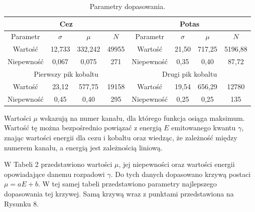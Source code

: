 \documentclass[10pt,a4paper]{article}
\begin{document}
\begin{table}[h!]
\centering
\caption{Parametry dopasowania.}
\begin{tabular}{|c|c|c|c|c|c|c|c|}
\hline
\multicolumn{4}{|c|}{Cez}                  & \multicolumn{4}{c|}{Potas}               \\ \hline
Parametr    & $\sigma$  & $\mu$    & $N$   & Parametr   & $\sigma$ & $\mu$  & $N$     \\ \hline
Wartość     & 12,733    & 332,242  & 49955 & Wartość    & 21,50    & 717,25 & 5196,88 \\ \hline
Niepewność  & 0,067     & 0,075    & 271   & Niepewność & 0,35     & 0,40   & 87,72   \\ \hline
\multicolumn{4}{|c|}{Pierwszy pik kobaltu} & \multicolumn{4}{c|}{Drugi pik kobaltu}   \\ \hline
Wartość     & 23,12     & 577,75   & 19158 & Wartość    & 19,54    & 656,29 & 12780   \\ \hline
Niepewność  & 0,45      & 0,40     & 295   & Niepewność & 0,25     & 0,25   & 135     \\ \hline
\end{tabular}
\end{table}

Wartości $\mu$ wskazują na numer kanału, dla którego funkcja osiąga maksimum. Wartość tę można bezpośrednio powiązać z energią $E$ emitowanego kwantu $\gamma$, znając wartości energii dla cezu i kobaltu oraz wiedząc, że zależność między numerem kanału, a energią jest zależnością liniową. 

W Tabeli 2 przedstawiono wartości $\mu$, jej niepewności oraz wartości energii opowiadające danemu rozpadowi $\gamma$. Do tych danych dopasowano krzywą postaci $\mu=aE+b$. W tej samej tabeli przedstawiono parametry najlepszego dopasowania tej krzywej. Samą krzywą wraz z punktami przedstawiona na Rysunku 8.
\end{document}
